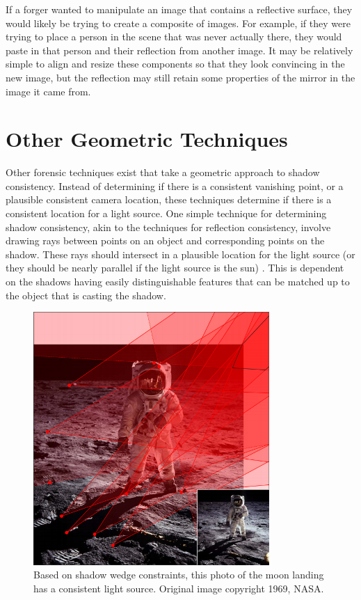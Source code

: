 \documentclass{thesis}
\begin{document}
If a forger wanted to manipulate an image that contains a reflective surface, they would likely be trying to create a composite of images. For example, if they were trying to place a person in the scene that was never actually there, they would paste in that person and their reflection from another image. It may be relatively simple to align and resize these components so that they look convincing in the new image, but the reflection may still retain some properties of the mirror in the image it came from.


\section{Other Geometric Techniques}
Other forensic techniques exist that take a geometric approach to shadow consistency. Instead of determining if there is a consistent vanishing point, or a plausible consistent camera location, these techniques determine if there is a consistent location for a light source. One simple technique for determining shadow consistency, akin to the techniques for reflection consistency, involve drawing rays between points on an object and corresponding points on the shadow. These rays should intersect in a plausible location for the light source (or they should be nearly parallel if the light source is the sun) \cite{farid2010image}. This is dependent on the shadows having easily distinguishable features that can be matched up to the object that is casting the shadow.

\begin{figure}
	\centering
    	\includegraphics[width=0.8\textwidth]{moon-landing-consistent}
	\caption{Based on shadow wedge constraints, this photo of the moon landing has a consistent light source. Original image copyright 1969, NASA. \cite[Fig.~1]{kee2013exposing}}
	\label{moon-landing-consistent}
\end{figure}
\end{document}
